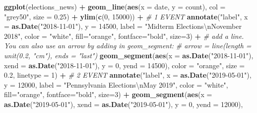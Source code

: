 \documentclass[
]{article}
\newenvironment{Shaded}{\begin{snugshade}}{\end{snugshade}}
\newcommand{\CharTok}[1]{\textcolor[rgb]{0.31,0.60,0.02}{#1}}
\newcommand{\CommentTok}[1]{\textcolor[rgb]{0.56,0.35,0.01}{\textit{#1}}}
\newcommand{\DataTypeTok}[1]{\textcolor[rgb]{0.13,0.29,0.53}{#1}}
\newcommand{\DecValTok}[1]{\textcolor[rgb]{0.00,0.00,0.81}{#1}}
\newcommand{\FloatTok}[1]{\textcolor[rgb]{0.00,0.00,0.81}{#1}}
\newcommand{\KeywordTok}[1]{\textcolor[rgb]{0.13,0.29,0.53}{\textbf{#1}}}
\newcommand{\NormalTok}[1]{#1}
\newcommand{\OperatorTok}[1]{\textcolor[rgb]{0.81,0.36,0.00}{\textbf{#1}}}
\newcommand{\StringTok}[1]{\textcolor[rgb]{0.31,0.60,0.02}{#1}}
\begin{document}
\begin{Shaded}
\begin{Highlighting}[]
\KeywordTok{ggplot}\NormalTok{(elections_news) }\OperatorTok{+}
\StringTok{  }\KeywordTok{geom_line}\NormalTok{(}\KeywordTok{aes}\NormalTok{(}\DataTypeTok{x =}\NormalTok{ date, }\DataTypeTok{y =}\NormalTok{ count), }\DataTypeTok{col =} \StringTok{"grey50"}\NormalTok{, }\DataTypeTok{size =} \FloatTok{0.25}\NormalTok{) }\OperatorTok{+}
\StringTok{  }\KeywordTok{ylim}\NormalTok{(}\KeywordTok{c}\NormalTok{(}\DecValTok{0}\NormalTok{, }\DecValTok{15000}\NormalTok{)) }\OperatorTok{+}
\StringTok{  }\CommentTok{# 1 EVENT}
\StringTok{  }\KeywordTok{annotate}\NormalTok{(}\StringTok{"label"}\NormalTok{, }\DataTypeTok{x =} \KeywordTok{as.Date}\NormalTok{(}\StringTok{"2018-11-01"}\NormalTok{), }\DataTypeTok{y =} \DecValTok{14500}\NormalTok{, }
           \DataTypeTok{label =} \StringTok{"Midterm Elections}\CharTok{\textbackslash{}n}\StringTok{November 2018"}\NormalTok{, }\DataTypeTok{color =} \StringTok{"white"}\NormalTok{, }\DataTypeTok{fill=}\StringTok{"orange"}\NormalTok{, }\DataTypeTok{fontface=}\StringTok{"bold"}\NormalTok{, }\DataTypeTok{size=}\DecValTok{3}\NormalTok{) }\OperatorTok{+}
\StringTok{  }\CommentTok{# add a line. You can also use an arrow by adding in geom_segment: }
\StringTok{  }\CommentTok{# arrow = line(length = unit(0.2, "cm"), ends = "last") }
\StringTok{  }\KeywordTok{geom_segment}\NormalTok{(}\KeywordTok{aes}\NormalTok{(}\DataTypeTok{x =} \KeywordTok{as.Date}\NormalTok{(}\StringTok{"2018-11-01"}\NormalTok{), }\DataTypeTok{xend =} \KeywordTok{as.Date}\NormalTok{(}\StringTok{"2018-11-01"}\NormalTok{), }\DataTypeTok{y =} \DecValTok{0}\NormalTok{, }\DataTypeTok{yend =} \DecValTok{14500}\NormalTok{), }
               \DataTypeTok{color =} \StringTok{"orange"}\NormalTok{, }\DataTypeTok{size =} \FloatTok{0.2}\NormalTok{, }\DataTypeTok{linetype =} \DecValTok{1}\NormalTok{) }\OperatorTok{+}
\StringTok{  }\CommentTok{# 2 EVENT}
\StringTok{  }\KeywordTok{annotate}\NormalTok{(}\StringTok{"label"}\NormalTok{, }\DataTypeTok{x =} \KeywordTok{as.Date}\NormalTok{(}\StringTok{"2019-05-01"}\NormalTok{), }\DataTypeTok{y =} \DecValTok{12000}\NormalTok{, }
           \DataTypeTok{label =} \StringTok{"Pennsylvania Elections}\CharTok{\textbackslash{}n}\StringTok{May 2019"}\NormalTok{, }\DataTypeTok{color =} \StringTok{"white"}\NormalTok{, }\DataTypeTok{fill=}\StringTok{"orange"}\NormalTok{, }\DataTypeTok{fontface=}\StringTok{"bold"}\NormalTok{, }\DataTypeTok{size=}\DecValTok{3}\NormalTok{) }\OperatorTok{+}
\StringTok{  }\KeywordTok{geom_segment}\NormalTok{(}\KeywordTok{aes}\NormalTok{(}\DataTypeTok{x =} \KeywordTok{as.Date}\NormalTok{(}\StringTok{"2019-05-01"}\NormalTok{), }\DataTypeTok{xend =} \KeywordTok{as.Date}\NormalTok{(}\StringTok{"2019-05-01"}\NormalTok{), }\DataTypeTok{y =} \DecValTok{0}\NormalTok{, }\DataTypeTok{yend =} \DecValTok{12000}\NormalTok{), }

\end{Highlighting}
\end{Shaded}
\end{document}

